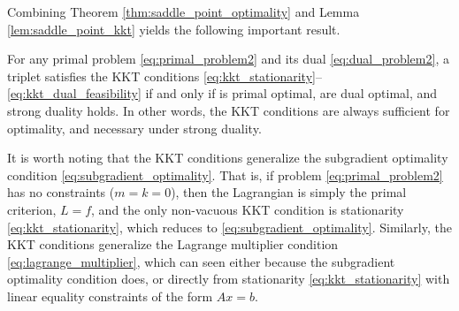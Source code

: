 Combining Theorem \ref{thm:saddle_point_optimality} and Lemma
\ref{lem:saddle_point_kkt} yields the following important result. 

\begin{Theorem}
\label{thm:kkt_optimality}
For any primal problem \eqref{eq:primal_problem2} and its dual
\eqref{eq:dual_problem2}, a triplet 
satisfies the KKT conditions
\eqref{eq:kkt_stationarity}--\eqref{eq:kkt_dual_feasibility} if and only if 
 is primal optimal,  are dual
optimal, and strong duality holds. In other words, the KKT conditions are always
sufficient for optimality, and necessary under strong duality.   
\end{Theorem}

It is worth noting that the KKT conditions generalize the subgradient optimality
condition \eqref{eq:subgradient_optimality}. That is, if problem
\eqref{eq:primal_problem2} has no constraints ($m = k = 0$), then the Lagrangian
is simply the primal criterion, $L = f$, and the only non-vacuous KKT condition
is stationarity \eqref{eq:kkt_stationarity}, which reduces to
\eqref{eq:subgradient_optimality}. Similarly, the KKT conditions generalize the
Lagrange multiplier condition \eqref{eq:lagrange_multiplier}, which can seen
either because the subgradient optimality condition does, or directly from
stationarity \eqref{eq:kkt_stationarity} with linear equality constraints of the
form $Ax = b$. 

